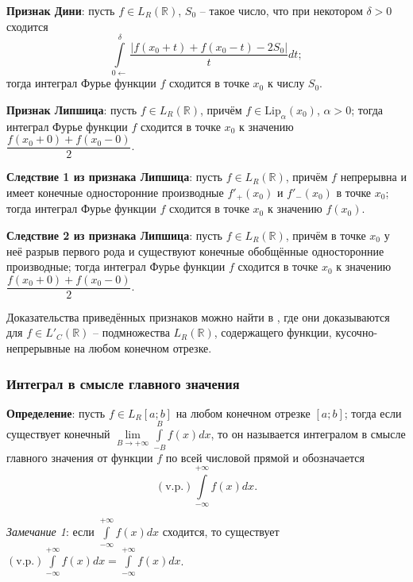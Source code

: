 \documentclass[12pt, a4paper, reqno]{article}
\begin{document}
    \textbf{Признак Дини}: пусть $f \in L_R(\mathbb{R})$, $S_0$ -- такое число, что при некотором
    $\delta > 0$ сходится
    \begin{equation*}
        \int\limits_{0\leftarrow}^{\delta} \frac{|f(x_0 + t) + f(x_0 - t) - 2S_0|}{t}dt;
    \end{equation*}
    тогда интеграл Фурье функции $f$ сходится в точке $x_0$ к числу $S_0$.

    \textbf{Признак Липшица}: пусть $f \in L_R(\mathbb{R})$, причём $f \in \text{Lip}_{\alpha}(x_0)$,
    $\alpha > 0$; тогда интеграл Фурье функции $f$ сходится в точке $x_0$ к значению
    $\dfrac{f(x_0 + 0) + f(x_0 - 0)}{2}$.

    \textbf{Следствие 1 из признака Липшица}: пусть $f \in L_R(\mathbb{R})$, причём $f$ непрерывна
    и имеет конечные односторонние производные $f'_{+}(x_0)$ и $f'_{-}(x_0)$ в точке $x_0$; тогда
    интеграл Фурье функции $f$ сходится в точке $x_0$ к значению $f(x_0)$.

    \textbf{Следствие 2 из признака Липшица}: пусть $f \in L_R(\mathbb{R})$, причём в точке $x_0$ у
    неё разрыв первого рода и существуют конечные обобщённые односторонние производные; тогда
    интеграл Фурье функции $f$ сходится в точке $x_0$ к значению $\dfrac{f(x_0 + 0) + f(x_0 - 0)}{2}$.

    Доказательства приведённых признаков можно найти в \cite{petrovich-3}, где они доказываются для
    $f \in L'_C(\mathbb{R})$ -- подмножества $L_R(\mathbb{R})$, содержащего функции, кусочно-непрерывные
    на любом конечном отрезке.

    \subsubsection{Интеграл в смысле главного значения}

    \textbf{Определение}: пусть $f \in L_R[a; b]$ на любом конечном отрезке $[a; b]$; тогда если
    существует конечный $\lim\limits_{B \to +\infty} \int\limits_{-B}^{B} f(x)dx$, то он называется
    интегралом в смысле главного значения от функции $f$ по всей числовой прямой и обозначается
    \begin{equation*}
        (\text{v.p.})\int\limits_{-\infty}^{+\infty} f(x)dx.
    \end{equation*}

    \textit{Замечание 1}: если $\int\limits_{-\infty}^{+\infty} f(x)dx$ сходится, то существует
    $(\text{v.p.})\int\limits_{-\infty}^{+\infty} f(x)dx = \int\limits_{-\infty}^{+\infty} f(x)dx$.
\end{document}
